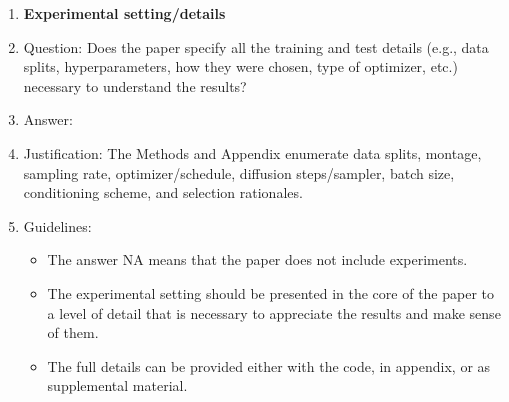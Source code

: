 \documentclass{article}
\begin{document}
\begin{enumerate}
\item {\bf Experimental setting/details}
    \item[] Question: Does the paper specify all the training and test details (e.g., data splits, hyperparameters, how they were chosen, type of optimizer, etc.) necessary to understand the results?
    \item[] Answer: \answerYes{}
    \item[] Justification: The Methods and Appendix enumerate data splits, montage, sampling rate, optimizer/schedule, diffusion steps/sampler, batch size, conditioning scheme, and selection rationales.
    \item[] Guidelines:
    \begin{itemize}
        \item The answer NA means that the paper does not include experiments.
        \item The experimental setting should be presented in the core of the paper to a level of detail that is necessary to appreciate the results and make sense of them.
        \item The full details can be provided either with the code, in appendix, or as supplemental material.
    \end{itemize}


\end{enumerate}
\end{document}
